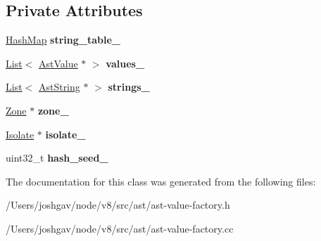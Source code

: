 \subsection*{Private Attributes}
\begin{DoxyCompactItemize}
\item 
\hyperlink{classv8_1_1internal_1_1_template_hash_map_impl}{Hash\+Map} {\bfseries string\+\_\+table\+\_\+}\hypertarget{classv8_1_1internal_1_1_ast_value_factory_af3adf857fb2ce6ca511a804e960ec2a4}{}\label{classv8_1_1internal_1_1_ast_value_factory_af3adf857fb2ce6ca511a804e960ec2a4}

\item 
\hyperlink{classv8_1_1internal_1_1_list}{List}$<$ \hyperlink{classv8_1_1internal_1_1_ast_value}{Ast\+Value} $\ast$ $>$ {\bfseries values\+\_\+}\hypertarget{classv8_1_1internal_1_1_ast_value_factory_aae1ff9d65fa39ed6c05bec51cb079c7b}{}\label{classv8_1_1internal_1_1_ast_value_factory_aae1ff9d65fa39ed6c05bec51cb079c7b}

\item 
\hyperlink{classv8_1_1internal_1_1_list}{List}$<$ \hyperlink{classv8_1_1internal_1_1_ast_string}{Ast\+String} $\ast$ $>$ {\bfseries strings\+\_\+}\hypertarget{classv8_1_1internal_1_1_ast_value_factory_a9d2885c82771b7e41d2cf12fa4e72ad6}{}\label{classv8_1_1internal_1_1_ast_value_factory_a9d2885c82771b7e41d2cf12fa4e72ad6}

\item 
\hyperlink{classv8_1_1internal_1_1_zone}{Zone} $\ast$ {\bfseries zone\+\_\+}\hypertarget{classv8_1_1internal_1_1_ast_value_factory_ad8257bd450dac36d74e885894ddf0ac3}{}\label{classv8_1_1internal_1_1_ast_value_factory_ad8257bd450dac36d74e885894ddf0ac3}

\item 
\hyperlink{classv8_1_1internal_1_1_isolate}{Isolate} $\ast$ {\bfseries isolate\+\_\+}\hypertarget{classv8_1_1internal_1_1_ast_value_factory_a264de10ddcd38decff1ad8f43cefd004}{}\label{classv8_1_1internal_1_1_ast_value_factory_a264de10ddcd38decff1ad8f43cefd004}

\item 
uint32\+\_\+t {\bfseries hash\+\_\+seed\+\_\+}\hypertarget{classv8_1_1internal_1_1_ast_value_factory_ae30dc72f200d74d3b55c952517420c2e}{}\label{classv8_1_1internal_1_1_ast_value_factory_ae30dc72f200d74d3b55c952517420c2e}

\end{DoxyCompactItemize}


The documentation for this class was generated from the following files\+:\begin{DoxyCompactItemize}
\item 
/\+Users/joshgav/node/v8/src/ast/ast-\/value-\/factory.\+h\item 
/\+Users/joshgav/node/v8/src/ast/ast-\/value-\/factory.\+cc\end{DoxyCompactItemize}
